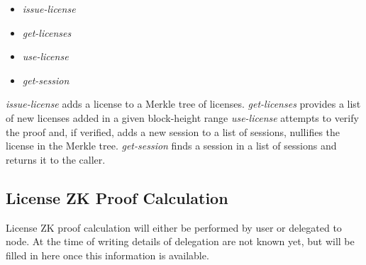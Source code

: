 \begin{itemize}%
	\item \textit{issue-license}
	\item \textit{get-licenses}
	\item \textit{use-license}
	\item \textit{get-session}
\end{itemize}


\begin{flushleft}
\textit{issue-license} adds a license to a Merkle tree of licenses. \textit{get-licenses} provides a list of new licenses added in a given block-height range \textit{use-license} attempts to verify the proof and, if verified, adds a new session to a list of sessions, nullifies the license in the Merkle tree. \textit{get-session} finds a session in a list of sessions and returns it to the caller.
\end{flushleft}

\subsection{License ZK Proof Calculation}

License ZK proof calculation will either be performed by user or delegated to node. At the time of writing details of delegation are not known yet, but will be filled in here once this information is available.
